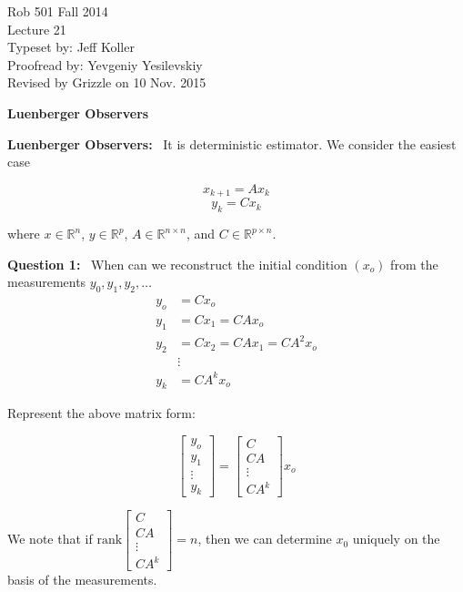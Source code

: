 \documentclass[letterpaper]{article}
\newcommand{\real}{\mathbb R}  %
\begin{document}
\baselineskip=48pt  %


\setlength{\parskip}{.3in}
\setlength{\itemsep}{.3in}

\pagestyle{plain}

{\Large \bf
\begin{center}
Rob 501 Fall 2014\\
Lecture 21\\
Typeset by:  Jeff Koller\\
Proofread by: Yevgeniy Yesilevskiy\\
Revised by Grizzle on 10 Nov. 2015
\end{center}
}

\Large

\begin{center}\textbf{Luenberger Observers}\end{center}

\textbf{Luenberger Observers:}~ It is deterministic estimator. We consider the easiest case

$$x_{k+1} = Ax_k$$
$$y_k = Cx_k$$

where $x \in \real^n$, $y \in \real^p$, $A \in \real^{n \times n}$, and $C \in \real^{p \times n}$.

\textbf{Question 1:}~ When can we reconstruct the initial condition $\left( x_o \right)$ from the measurements $y_0, y_1, y_2, \ldots$
\begin{align*}
y_o &= Cx_o\\
y_1 &= Cx_1 = CAx_o\\
y_2 &= Cx_2 = CAx_1 = CA^2x_o\\
&\vdots\\
y_k &= CA^kx_o
\end{align*}

Represent the above matrix form:

$$ \left[ \begin{array}{c} y_o \\ y_1 \\ \vdots \\ y_k \end{array} \right] = \left[ \begin{array}{c} C \\ CA \\ \vdots \\ CA^k \end{array} \right]x_o$$

We note that if $\text{rank} \left[ \begin{array}{c} C \\ CA \\ \vdots \\ CA^k \end{array} \right] = n$, then we can determine $x_0$ uniquely on the basis of the measurements.
\end{document}
